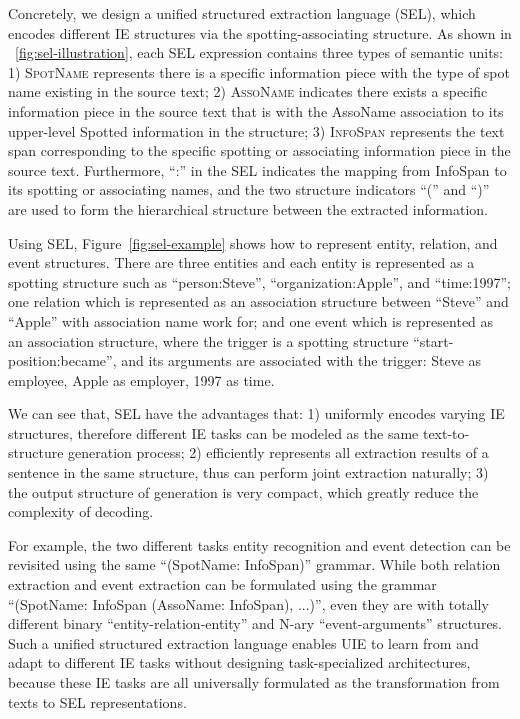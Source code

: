\documentclass[11pt]{article}
\begin{document}
Concretely, we design a unified structured extraction language (SEL), which encodes different IE structures via the spotting-associating structure.
As shown in \figurename~\ref{fig:sel-illustration}, each SEL expression contains three types of semantic units:
1) \textsc{SpotName} represents there is a specific information piece with the type of spot name existing in the source text;
2) \textsc{AssoName} indicates there exists a specific information piece in the source text that is with the AssoName association to its upper-level Spotted information in the structure;
3)  \textsc{InfoSpan} represents the text span corresponding to the specific spotting or associating information piece in the source text.
Furthermore, ``:'' in the SEL indicates the mapping from InfoSpan to its spotting or associating names, and the two structure indicators ``('' and ``)'' are used to form the hierarchical structure between the extracted information.

Using SEL, Figure~\ref{fig:sel-example}  shows how to represent entity, relation, and event structures.
There are three entities and each entity is represented as a spotting structure such as ``person:Steve'', ``organization:Apple'', and ``time:1997'';
one relation which is represented as an association structure between ``Steve'' and ``Apple'' with association name work for;
and one event which is represented as an association structure, where the trigger is a spotting structure ``start-position:became'', and its arguments are associated with the trigger: Steve as employee, Apple as employer, 1997 as time.

We can see that, SEL have the advantages that:
1) uniformly encodes varying IE structures, therefore different IE tasks can be modeled as the same text-to-structure generation process;
2) efficiently represents all extraction results of a sentence in the same structure, thus can perform joint extraction naturally;
3) the output structure of generation is very compact, which greatly reduce the complexity of decoding.

For example, the two different tasks entity recognition and event detection can be revisited using the same ``(SpotName: InfoSpan)'' grammar. 
While both relation extraction and event extraction can be formulated using the grammar ``(SpotName: InfoSpan (AssoName: InfoSpan), ...)'', even they are with totally different binary ``entity-relation-entity'' and N-ary ``event-arguments'' structures.
Such a unified structured extraction language enables UIE to learn from and adapt to different IE tasks without designing task-specialized architectures, because these IE tasks are all universally formulated as the transformation from texts to SEL representations.
\end{document}
